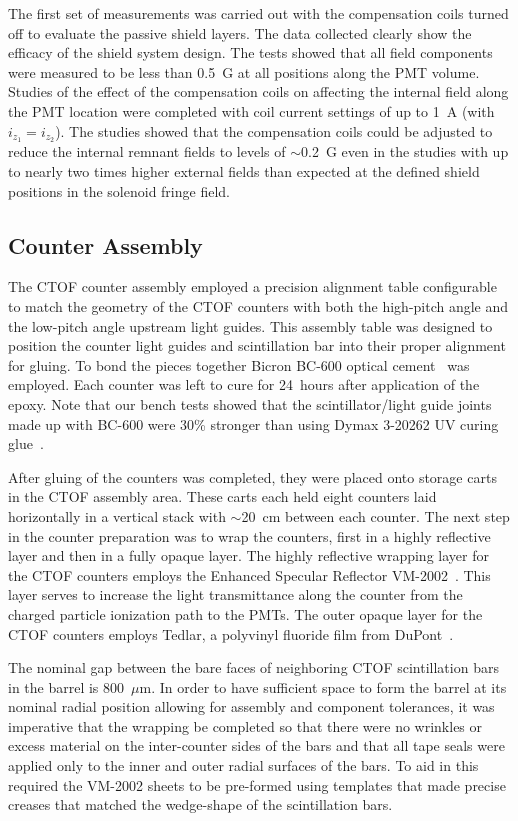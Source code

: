\documentclass{elsart}
\begin{document}
The first set of measurements was carried out with the compensation coils turned off to evaluate
the passive shield layers. The data collected clearly show the efficacy of the shield system design.
The tests showed that all field components were measured to be less than 0.5~G at all positions
along the PMT volume. Studies of the effect of the compensation coils on affecting the internal field
along the PMT location were completed with coil current settings of up to 1~A (with $i_{z_1} = i_{z_2}$).
The studies showed that the compensation coils could be adjusted to reduce the internal remnant
fields to levels of $\sim$0.2~G even in the studies with up to nearly two times higher external fields
than expected at the defined shield positions in the solenoid fringe field.

\subsection{Counter Assembly}
\label{assembly}
           
The CTOF counter assembly employed a precision alignment table configurable to match the geometry
of the CTOF counters with both the high-pitch angle and the low-pitch angle upstream light guides. This
assembly table was designed to position the counter light guides and scintillation bar into their proper
alignment for gluing. To bond the pieces together Bicron BC-600 optical cement~\cite{bc600-ref} was
employed. Each counter was left to cure for 24~hours after application of the epoxy. Note that our
bench tests showed that the scintillator/light guide joints made up with BC-600 were 30\% stronger
than using Dymax 3-20262 UV curing glue~\cite{dymax}.

After gluing of the counters was completed, they were placed onto storage carts in the CTOF assembly
area. These carts each held eight counters laid horizontally in a vertical stack with $\sim$20~cm
between each counter. The next step in the counter preparation was to wrap the counters, first in a highly
reflective layer and then in a fully opaque layer. The highly reflective wrapping layer for the CTOF counters
employs the Enhanced Specular Reflector VM-2002~\cite{vm2002-ref}. This layer serves to increase the
light transmittance along the counter from the charged particle ionization path to the PMTs. The outer
opaque layer for the CTOF counters employs Tedlar, a polyvinyl fluoride film from DuPont~\cite{dupont-ref}.

The nominal gap between the bare faces of neighboring CTOF scintillation bars in the barrel is
800~$\mu$m. In order to have sufficient space to form the barrel at its nominal radial position allowing
for assembly and component tolerances, it was imperative that the wrapping be completed so that there
were no wrinkles or excess material on the inter-counter sides of the bars and that all tape seals were
applied only to the inner and outer radial surfaces of the bars. To aid in this required the VM-2002 sheets
to be pre-formed using templates that made precise creases that matched the wedge-shape of the
scintillation bars.
\end{document}
